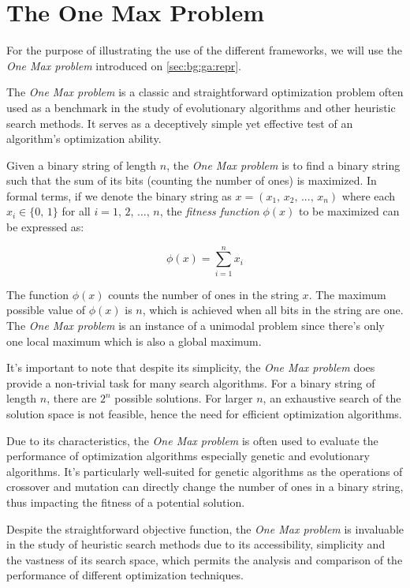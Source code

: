 \section{The One Max Problem}
\label{sota:omp}
  For the purpose of illustrating the use of the different frameworks, we will
  use the \textit{One Max problem} introduced on \vref{sec:bg:ga:repr}.

  The \emph{One Max problem} is a classic and straightforward optimization
  problem often used as a benchmark in the study of evolutionary algorithms and
  other heuristic search methods.
  It serves as a deceptively simple yet effective test of an algorithm's
  optimization ability.

  Given a binary string of length \(n\), the \textit{One Max problem} is to find a
  binary string such that the sum of its bits (counting the number of ones) is
  maximized.
  In formal terms, if we denote the binary string as $x = (x_1,\, x_2,\, ...,\,
  x_n)$ where each $x_i \in \{0,\,1\}$ for all $i = 1,\, 2,\, \dots,\, n$, the 
  \textit{fitness function} $\phi(x)$ to be maximized can be expressed as:

  \begin{equation}
    \phi(x) = \sum_{i=1}^{n} x_i
  \end{equation}

  The function $\phi(x)$ counts the number of ones in the string $x$.
  The maximum possible value of $\phi(x)$ is $n$, which is achieved when all 
  bits in the string are one.
  The \textit{One Max problem} is an instance of a unimodal problem since
  there's only one local maximum which is also a global maximum.

  It's important to note that despite its simplicity, the \textit{One Max
  problem} does provide a non-trivial task for many search algorithms.
  For a binary string of length $n$, there are $2^n$ possible solutions.
  For larger $n$, an exhaustive search of the solution space is not feasible,
  hence the need for efficient optimization algorithms.

  Due to its characteristics, the \textit{One Max problem} is often used to
  evaluate the performance of optimization algorithms especially genetic and
  evolutionary algorithms.
  It's particularly well-suited for genetic algorithms as the operations of
  crossover and mutation can directly change the number of ones in a binary
  string, thus impacting the fitness of a potential solution.

  Despite the straightforward objective function, the \textit{One Max problem} is
  invaluable in the study of heuristic search methods due to its accessibility,
  simplicity and the vastness of its search space, which permits the analysis
  and comparison of the performance of different optimization techniques.
